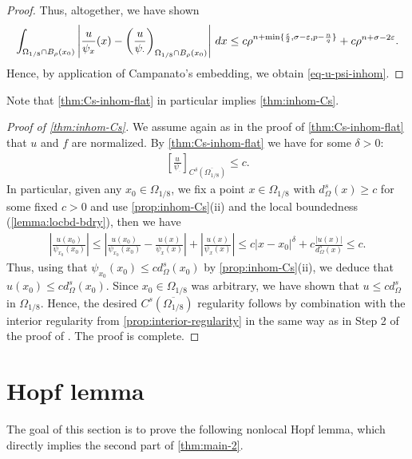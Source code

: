 \documentclass[11pt,reqno]{amsart}
\theoremstyle{plain}
\theoremstyle{definition}
\numberwithin{equation}{section}
\newcommand{\eps}{\varepsilon}
\newcommand{\1}{\mathbbm{1}}
\renewcommand{\d}{\textnormal{\,d}}
\begin{document}
\begin{proof}
Thus, altogether, we have shown
\begin{align*}
\int_{\Omega_{1/8} \cap B_\rho(x_0)} \left| \frac{u}{\psi_x}(x) - \left( \frac{u}{\psi_{\cdot}} \right)_{\Omega_{1/8} \cap B_{\rho}(x_0)} \right| \d x \le c \rho^{n+\min\{\frac{\eps}{2}, \sigma-\varepsilon, p - \frac{n}{q} \}}+ c \rho^{n + \sigma - 2\eps}.
\end{align*}
Hence, by application of Campanato's embedding, we obtain \eqref{eq-u-psi-inhom}.
\end{proof}


Note that \autoref{thm:Cs-inhom-flat} in particular implies \autoref{thm:inhom-Cs}.

\begin{proof}[Proof of \autoref{thm:inhom-Cs}]
We assume again as in the proof of \autoref{thm:Cs-inhom-flat} that $u$ and $f$ are normalized. By \autoref{thm:Cs-inhom-flat} we have for some $\delta > 0$:
\begin{align*}
\left[ \frac{u}{\psi_{\cdot}} \right]_{C^{\delta}(\overline{\Omega_{1/8}})} \le c.
\end{align*}
In particular, given any $x_0 \in \Omega_{1/8}$, we fix a point $x \in \Omega_{1/8}$ with $d_{\Omega}^s(x) \ge c$ for some fixed $c > 0$ and use \autoref{prop:inhom-Cs}(ii) and the local boundedness (\autoref{lemma:locbd-bdry}), then we have
\begin{align*}
\left| \frac{u(x_0)}{\psi_{x_0}(x_0)} \right| \le \left| \frac{u(x_0)}{\psi_{x_0}(x_0)} - \frac{u(x)}{\psi_x(x)} \right| + \left|\frac{u(x)}{\psi_x(x)}\right| \le c |x-x_0|^{\delta} + c \frac{|u(x)|}{d_{\Omega}^{s}(x)} \le c.
\end{align*}
Thus, using that $\psi_{x_0}(x_0) \le c d^s_{\Omega}(x_0)$ by \autoref{prop:inhom-Cs}(ii), we deduce that $u(x_0) \le c d^s_{\Omega}(x_0)$. Since $x_0 \in \Omega_{1/8}$ was arbitrary, we have shown that $u \le c d^s_{\Omega}$ in $\Omega_{1/8}$. Hence, the desired $C^s(\overline{\Omega_{1/8}})$ regularity follows by combination with the interior regularity from \autoref{prop:interior-regularity} in the same way as in Step 2 of the proof of \cite[Proposition 2.6.4]{FeRo24}. The proof is complete.
\end{proof}



\section{Hopf lemma}
\label{sec:Hopf}

The goal of this section is to prove the following nonlocal Hopf lemma, which directly implies the second part of \autoref{thm:main-2}.
\end{document}
